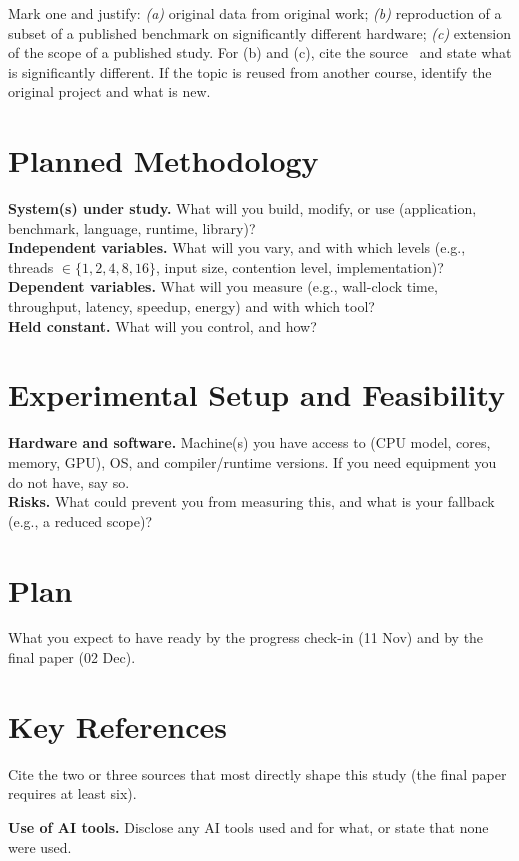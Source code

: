 \documentclass[sigplan]{acmart}
\begin{document}
Mark one and justify: \emph{(a)} original data from original work; \emph{(b)} reproduction of a subset of a published benchmark on significantly different hardware; \emph{(c)} extension of the scope of a published study. For (b) and (c), cite the source~\cite{lamport1978clocks} and state what is significantly different. If the topic is reused from another course, identify the original project and what is new.

\section{Planned Methodology}

\noindent\textbf{System(s) under study.} What will you build, modify, or use (application, benchmark, language, runtime, library)? \\

\noindent\textbf{Independent variables.} What will you vary, and with which levels (e.g., threads $\in \{1,2,4,8,16\}$, input size, contention level, implementation)? \\

\noindent\textbf{Dependent variables.} What will you measure (e.g., wall-clock time, throughput, latency, speedup, energy) and with which tool? \\

\noindent\textbf{Held constant.} What will you control, and how?

\section{Experimental Setup and Feasibility}

\noindent\textbf{Hardware and software.} Machine(s) you have access to (CPU model, cores, memory, GPU), OS, and compiler/runtime versions. If you need equipment you do not have, say so. \\

\noindent\textbf{Risks.} What could prevent you from measuring this, and what is your fallback (e.g., a reduced scope)?

\section{Plan}

What you expect to have ready by the progress check-in (11 Nov) and by the final paper (02 Dec).

\section{Key References}

Cite the two or three sources that most directly shape this study (the final paper requires at least six).

\medskip
\noindent\textbf{Use of AI tools.} Disclose any AI tools used and for what, or state that none were used.



\end{document}
